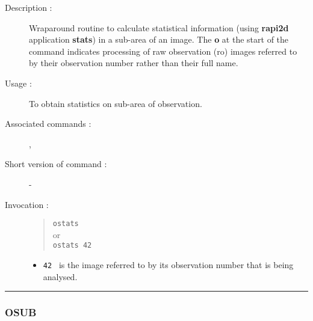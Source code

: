 \begin{description}

\item[Description :] Wraparound routine to calculate statistical
information (using {\bf rapi2d} application {\bf stats}) in a sub-area of an
image. The {\bf o} at the start of the command indicates processing of raw
observation ({\sc ro}) images referred to by their observation number
rather than their full name.

\item[Usage :] To obtain statistics on sub-area of observation.
\item[Associated commands :] {\tt {}},
{\tt {}}
\item[Short version of command :] -
\item[Invocation :]

\begin{quote}{\tt  ostats }\\
or \\
{\tt ostats 42 }
\end{quote}

\begin{itemize}

\item {\tt 42 } is the image referred to by its observation number that
  is being analysed.
\end{itemize}

\end{description}

\hrule
\subsubsection*{\label{OSUB}OSUB}


